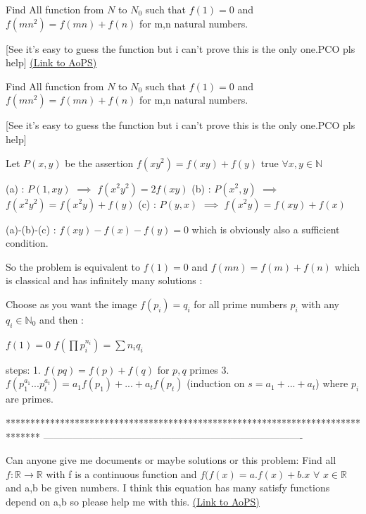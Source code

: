 \begin{problem}
	Find All function from $N$ to $N_{0}$ such that $f(1)=0$ and $f(mn^2)=f(mn)+f(n)$ for m,n natural numbers.

[See it's easy to guess the function but i can't prove this  is the only one.PCO pls help]
	\flushright \href{https://artofproblemsolving.com/community/c6h495099}{(Link to AoPS)}
\end{problem}



\begin{solution}
	\begin{tcolorbox}Find All function from $N$ to $N_{0}$ such that $f(1)=0$ and $f(mn^2)=f(mn)+f(n)$ for m,n natural numbers.

[See it's easy to guess the function but i can't prove this  is the only one.PCO pls help]\end{tcolorbox}
Let $P(x,y)$ be the assertion $f(xy^2)=f(xy)+f(y)$ true $\forall x,y\in\mathbb N$

(a) : $P(1,xy)$ $\implies$ $f(x^2y^2)=2f(xy)$
(b) : $P(x^2,y)$ $\implies$ $f(x^2y^2)=f(x^2y)+f(y)$ 
(c) : $P(y,x)$ $\implies$ $f(x^2y)=f(xy)+f(x)$

(a)-(b)-(c) :  $f(xy)-f(x)-f(y)=0$ which is obviously also a sufficient condition.

So the problem is equivalent to $f(1)=0$ and $f(mn)=f(m)+f(n)$ which is classical and has infinitely many solutions :

Choose as you want the image $f(p_i)=q_i$ for all prime numbers $p_i$ with any $q_i\in\mathbb N_0$ and then :

$f(1)=0$
$f(\prod p_i^{n_i})=\sum n_iq_i$
\end{solution}



\begin{solution}
	steps:
1. $ f(pq)=f(p)+f(q) $ for $ p,q $ primes 
3. $ f(p_{1}^{a_{1}}...p_{t}^{a_{t}})=a_{1}f(p_{1})+...+a_{t}f(p_{t}) $ (induction on $ s=a_{1}+...+a_{t} $) where $ p_{i} $ are primes.
\end{solution}
*******************************************************************************
-------------------------------------------------------------------------------

\begin{problem}
	Can anyone give me documents or maybe solutions or this problem: 
Find all $f:\mathbb{R}\rightarrow\mathbb{R}$ with f is a continuous function and $ f(f(x) = a. f(x) + b.x$ $\forall$ $x\in\mathbb{R}$ and a,b be given numbers.
I think this equation has many satisfy functions depend on a,b so please help me with this.
	\flushright \href{https://artofproblemsolving.com/community/c6h1344617}{(Link to AoPS)}
\end{problem}



